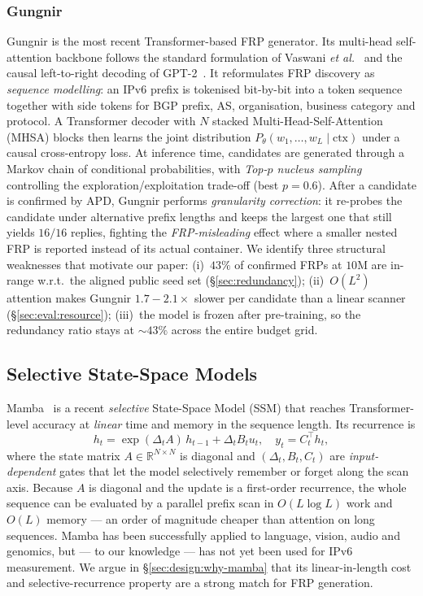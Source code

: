 \documentclass[conference]{IEEEtran}
\begin{document}
\subsubsection{Gungnir~\cite{wei2025gungnir}}
\label{sec:bg:gungnir}
Gungnir is the most recent Transformer-based FRP generator.
Its multi-head self-attention backbone follows the standard
formulation of Vaswani \emph{et al.}~\cite{vaswani2017attention}
and the causal left-to-right decoding of
GPT-2~\cite{radford2019gpt2}.  It reformulates FRP discovery as
\emph{sequence modelling}: an IPv6 prefix is tokenised bit-by-bit
into a token sequence together with side tokens for BGP prefix,
AS, organisation, business category and protocol.  A Transformer
decoder with $N$ stacked Multi-Head-Self-Attention (MHSA) blocks
then learns the joint distribution
$P_\theta(w_1,\ldots,w_L\mid\text{ctx})$ under a causal
cross-entropy loss.  At inference time, candidates are generated
through a Markov chain of conditional probabilities, with
\emph{Top-$p$ nucleus sampling}~\cite{holtzman2020top-p}
controlling the exploration/exploitation trade-off (best
$p{=}0.6$).  After a candidate is confirmed by APD, Gungnir
performs \emph{granularity correction}: it re-probes the
candidate under alternative prefix lengths and keeps the largest
one that still yields $16/16$ replies, fighting the
\emph{FRP-misleading} effect where a smaller nested FRP is
reported instead of its actual container.  We identify three
structural weaknesses that motivate our paper: (i)~$43\%$ of
confirmed FRPs at $10$M are in-range w.r.t.\ the aligned public
seed set (\S\ref{sec:redundancy}); (ii)~$O(L^2)$ attention makes
Gungnir $1.7\!-\!2.1\times$ slower per candidate than a linear
scanner (\S\ref{sec:eval:resource}); (iii)~the model is frozen
after pre-training, so the redundancy ratio stays at
$\sim\!43\%$ across the entire budget grid.

\subsection{Selective State-Space Models}
\label{sec:bg:mamba}
Mamba~\cite{gu2023mamba,gu2021s4} is a recent \emph{selective}
State-Space Model (SSM) that reaches Transformer-level accuracy
at \emph{linear} time and memory in the sequence length.  Its
recurrence is
\begin{equation}
h_t = \exp(\Delta_t A)\,h_{t-1} + \Delta_t B_t u_t,
\quad y_t = C_t^{\top} h_t,
\label{eq:mamba-ssm}
\end{equation}
where the state matrix $A\!\in\!\mathbb{R}^{N\times N}$ is
diagonal and $(\Delta_t,B_t,C_t)$ are \emph{input-dependent}
gates that let the model selectively remember or forget along
the scan axis.  Because $A$ is diagonal and the update is a
first-order recurrence, the whole sequence can be evaluated by
a parallel prefix scan in $O(L\log L)$ work and $O(L)$ memory
--- an order of magnitude cheaper than attention on long
sequences.  Mamba has been successfully applied to language,
vision, audio and genomics, but --- to our knowledge --- has
not yet been used for IPv6 measurement.  We argue in
\S\ref{sec:design:why-mamba} that its linear-in-length cost and
selective-recurrence property are a strong match for FRP
generation.
\end{document}
